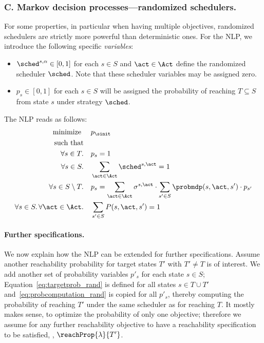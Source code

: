 \subsubsection{C. Markov decision processes---randomized schedulers.}
For some properties, in particular when having multiple objectives, randomized schedulers are strictly more powerful than deterministic ones. For the NLP, we introduce the following specific \emph{variables}:
		\begin{itemize}
			\item $\sched^{s,\alpha}\in[0,1]$ for each $s\in S$ and $\act\in\Act$ define the randomized scheduler $\sched$. Note that these scheduler variables may be assigned zero.
			\item $p_s\in[0,1]$ for each $s\in S$ will be assigned the probability of reaching $T\subseteq S$ from state $s$ under strategy $\sched$.
		\end{itemize}
	 	The NLP reads as follows:
		\begin{align}
			\text{minimize } &\quad p_{\sinit}\label{eq:min_rand}\\
			\text{such that}\\
			\forall s\in T.	 &\quad p_s=1\label{eq:targetprob_rand}\\
			\forall s\in S.	&\quad \sum_{\act\in\Act}\sched^{s,\act}=1\label{eq:welldefined_sched_rand}\\
			\forall s\in S\setminus T.	&\quad p_s=\sum_{\act\in\Act}\sigma^{s,\act}\cdot\sum_{s'\in S}	\probmdp(s,\act,s')\cdot p_{s'}\label{eq:probcomputation_rand}\\
			\forall s\in S.\, \forall\act\in\Act.	 &\quad \sum_{s'\in S}P(s,\act,s')=1\label{eq:well-defined_probs_rand}
		\end{align}
	\paragraph{Further specifications.}
We now explain how the NLP can be extended for further specifications. Assume  another reachability probability for target states $T'$ with $T'\neq T$ is of interest. We add another set of probability variables $p'_s$ for each state $s\in S$; Equation~\eqref{eq:targetprob_rand} is defined for all states $s\in T\cup T'$ and~\eqref{eq:probcomputation_rand} is copied for all $p'_s$, thereby computing the probability of reaching $T'$ under the same scheduler as for reaching $T$. It mostly makes sense, to optimize the probability of only one objective; therefore we assume for any further reachability objective to have a reachability specification to be satisfied, \eg, $\reachProp{\lambda}{T'}$.

